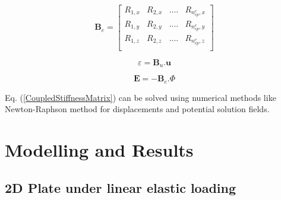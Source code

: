 \documentclass[11pt]{article}
\begin{document}
\begin{equation} \label{BeMatrix}
\textbf{B}_e =
\begin{bmatrix}
R_{1,x} & R_{2,x} & .... & R_{n_{cp}^e,x} \\
R_{1,y} & R_{2,y} & .... & R_{n_{cp}^e,y} \\
R_{1,z} & R_{2,z} & .... & R_{n_{cp}^e,z} \\
\end{bmatrix}
\end{equation}

\begin{equation}
\varepsilon = \textbf{B}_u . \textbf{u}
\end{equation}

\begin{equation}
\textbf{E} = - \textbf{B}_e . \Phi
\end{equation}

\noindent
Eq. (\ref{CoupledStiffnessMatrix}) can be solved using numerical methods like
Newton-Raphson method for displacements and potential solution fields.

\newpage
\section{Modelling and Results}
\subsection{2D Plate under linear elastic loading} 
\end{document}
